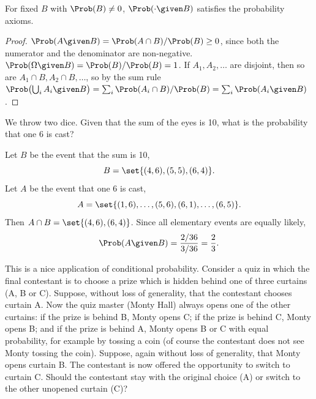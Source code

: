 \begin{proposition}\label{prop:conditional-probability-is-probability}
For fixed $B$ with $\Prob(B) \ne 0$, $\Prob(\cdot \given B)$ satisfies the probability axioms.
\end{proposition}

\begin{proof}
$\Prob(A \given B) = \Prob(A \cap B)/\Prob(B) \ge 0$, since both the numerator and the denominator are non-negative. $\Prob(\Omega \given B) = \Prob(B)/\Prob(B) = 1$. If $A_1, A_2, \ldots$ are disjoint, then so are $A_1 \cap B, A_2 \cap B, \ldots$, so by the sum rule $\Prob\bigl(\bigcup_i A_i \given B\bigr) = \sum_i \Prob(A_i \cap B)/\Prob(B) = \sum_i \Prob(A_i \given B)$.
\end{proof}

\begin{example}\label{ex:two-dice-conditional}
We throw two dice. Given that the sum of the eyes is 10, what is the probability that one 6 is cast?
\end{example}

\begin{solution}
Let $B$ be the event that the sum is 10,
\[
  B = \set{(4,6), (5,5), (6,4)}.
\]
Let $A$ be the event that one 6 is cast,
\[
  A = \set{(1,6), \ldots, (5,6), (6,1), \ldots, (6,5)}.
\]
Then $A \cap B = \set{(4,6), (6,4)}$. Since all elementary events are equally likely,
\[
  \Prob(A \given B) = \frac{2/36}{3/36} = \frac23.
\]
\end{solution}

\begin{example}\label{ex:monty-hall}
This is a nice application of conditional probability. Consider a quiz in which the final contestant is to choose a prize which is hidden behind one of three curtains (A, B or C). Suppose, without loss of generality, that the contestant chooses curtain A. Now the quiz master (Monty Hall) always opens one of the other curtains: if the prize is behind B, Monty opens C; if the prize is behind C, Monty opens B; and if the prize is behind A, Monty opens B or C with equal probability, for example by tossing a coin (of course the contestant does not see Monty tossing the coin). Suppose, again without loss of generality, that Monty opens curtain B. The contestant is now offered the opportunity to switch to curtain C. Should the contestant stay with the original choice (A) or switch to the other unopened curtain (C)?
\end{example}

